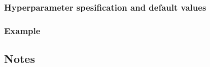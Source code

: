 \documentclass[12pt]{article}
\begin{document}
\subsubsection*{Hyperparameter spesification and default values}


\subsubsection*{Example}


\subsection*{Notes}


        
\end{document}
